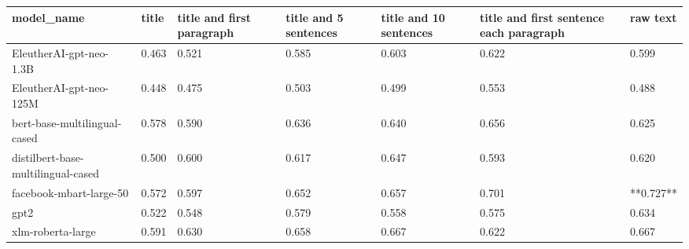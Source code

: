 \begin{tabular}{lllllll}
\toprule
                        model\_name & title & title and first paragraph & title and 5 sentences & title and 10 sentences & title and first sentence each paragraph &  raw text \\
\midrule
           EleutherAI-gpt-neo-1.3B & 0.463 &                     0.521 &                 0.585 &                  0.603 &                                   0.622 &     0.599 \\
           EleutherAI-gpt-neo-125M & 0.448 &                     0.475 &                 0.503 &                  0.499 &                                   0.553 &     0.488 \\
      bert-base-multilingual-cased & 0.578 &                     0.590 &                 0.636 &                  0.640 &                                   0.656 &     0.625 \\
distilbert-base-multilingual-cased & 0.500 &                     0.600 &                 0.617 &                  0.647 &                                   0.593 &     0.620 \\
           facebook-mbart-large-50 & 0.572 &                     0.597 &                 0.652 &                  0.657 &                                   0.701 & **0.727** \\
                              gpt2 & 0.522 &                     0.548 &                 0.579 &                  0.558 &                                   0.575 &     0.634 \\
                 xlm-roberta-large & 0.591 &                     0.630 &                 0.658 &                  0.667 &                                   0.622 &     0.667 \\
\bottomrule
\end{tabular}
